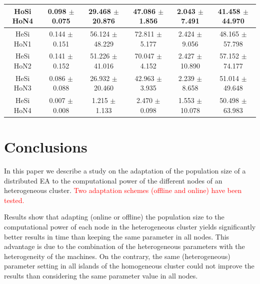 \documentclass[final,1p,times]{elsarticle}
\begin{document}
\begin{table}[htb]
{\begin{tabular}{|c|c|c|c|c|c|}
HoSi HoN4  &  0.098 $\pm$  0.075  & 29.468 $\pm$ 20.876 & 47.086 $\pm$ 1.856 &  2.043 $\pm$  7.491 &  41.458 $\pm$ 44.970 \\ \hline \hline
HeSi HoN1 &   0.144 $\pm$  0.151 &  56.124 $\pm$ 48.229 & 72.811 $\pm$ 5.177  & 2.424 $\pm$  9.056  & 48.165  $\pm$57.798 \\ \hline
HeSi HoN2 &   0.141 $\pm$  0.152 &  51.226 $\pm$ 41.016 & 70.047 $\pm$ 4.152  & 2.427 $\pm$  10.890 & 57.152  $\pm$74.177 \\ \hline
HeSi HoN3 &   0.086 $\pm$  0.088 &  26.932 $\pm$ 20.460 & 42.963 $\pm$ 3.935  & 2.239 $\pm$  8.658  & 51.014  $\pm$49.648 \\ \hline
HeSi HoN4 &   0.007 $\pm$  0.008 &  1.215  $\pm$ 1.133  & 2.470  $\pm$ 0.098  & 1.553 $\pm$  10.078 & 50.498 $\pm$ 63.983 \\ \hline
\end{tabular}
}
\label{tab:onemaxtimes}
\end{table}

\section{Conclusions}


In this paper we describe a study on the adaptation of the population size of a distributed EA to the computational power of the different nodes of an heterogeneous cluster. \textcolor{red}{Two adaptation schemes (offline and online) have been tested.}

Results show that adapting (online or offline) the population size to the computational power of each node in the heterogeneous cluster yields significantly
better results in time than keeping the same parameter in all nodes. This advantage is due to the combination of the heterogeneous parameters with the heterogeneity of the machines. On the contrary, the same (heterogeneous) parameter setting in all islands of the homogeneous cluster could not improve the results than considering the same parameter value in all nodes.
\end{document}
